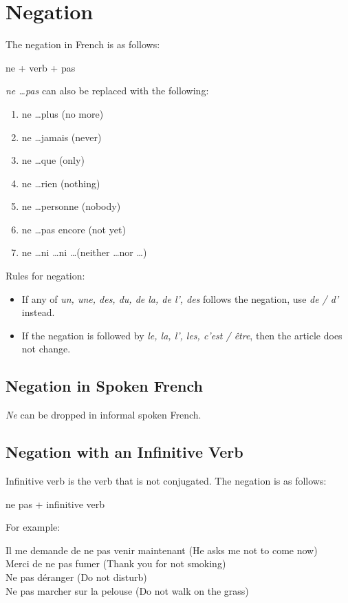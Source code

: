 \documentclass{book}
\begin{document}
\chapter{Negation}
    The negation in French is as follows:
    \begin{center}
        ne + verb + pas
    \end{center}
    \textit{ne \dots pas} can also be replaced with the following:
    \begin{enumerate}
        \item ne \dots plus (no more)
        \item ne \dots jamais (never)
        \item ne \dots que (only)
        \item ne \dots rien (nothing)
        \item ne \dots personne (nobody)
        \item ne \dots pas encore (not yet)
        \item ne \dots ni \dots ni \dots (neither \dots nor \dots)
    \end{enumerate}
    Rules for negation:
    \begin{itemize}
        \item If any of \textit{un, une, des, du, de la, de l', des} follows the negation, use \textit{de / d'} instead.
        \item If the negation is followed by \textit{le, la, l', les, c'est / être}, then the article does not change.
    \end{itemize}

    \section{Negation in Spoken French}
        \textit{Ne} can be dropped in informal spoken French.

    \section{Negation with an Infinitive Verb}
        Infinitive verb is the verb that is not conjugated. The negation is as follows:
        \begin{center}
            ne pas + infinitive verb
        \end{center}
        For example:
        \begin{center}
            Il me demande de ne pas venir maintenant (He asks me not to come now) \\
            Merci de ne pas fumer (Thank you for not smoking) \\
            Ne pas déranger (Do not disturb) \\
            Ne pas marcher sur la pelouse (Do not walk on the grass)
        \end{center}
\end{document}
